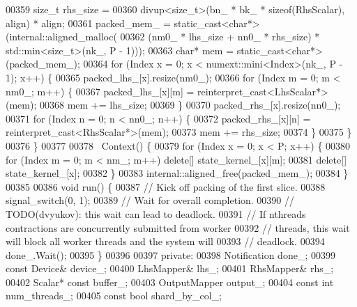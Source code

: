 \begin{DoxyCode}
00359       \textcolor{keywordtype}{size\_t} rhs\_size =
00360           divup<size\_t>(bn\_ * bk\_ * \textcolor{keyword}{sizeof}(RhsScalar), align) * align;
00361       packed\_mem\_ = \textcolor{keyword}{static\_cast<}\textcolor{keywordtype}{char}*\textcolor{keyword}{>}(internal::aligned\_malloc(
00362           (nm0\_ * lhs\_size + nn0\_ * rhs\_size) * std::min<size\_t>(nk\_, P - 1)));
00363       \textcolor{keywordtype}{char}* mem = \textcolor{keyword}{static\_cast<}\textcolor{keywordtype}{char}*\textcolor{keyword}{>}(packed\_mem\_);
00364       \textcolor{keywordflow}{for} (Index x = 0; x < numext::mini<Index>(nk\_, P - 1); x++) \{
00365         packed\_lhs\_[x].resize(nm0\_);
00366         \textcolor{keywordflow}{for} (Index m = 0; m < nm0\_; m++) \{
00367           packed\_lhs\_[x][m] = \textcolor{keyword}{reinterpret\_cast<}LhsScalar*\textcolor{keyword}{>}(mem);
00368           mem += lhs\_size;
00369         \}
00370         packed\_rhs\_[x].resize(nn0\_);
00371         \textcolor{keywordflow}{for} (Index n = 0; n < nn0\_; n++) \{
00372           packed\_rhs\_[x][n] = \textcolor{keyword}{reinterpret\_cast<}RhsScalar*\textcolor{keyword}{>}(mem);
00373           mem += rhs\_size;
00374         \}
00375       \}
00376     \}
00377 
00378     ~Context() \{
00379       \textcolor{keywordflow}{for} (Index x = 0; x < P; x++) \{
00380         \textcolor{keywordflow}{for} (Index m = 0; m < nm\_; m++) \textcolor{keyword}{delete}[] state\_kernel\_[x][m];
00381         \textcolor{keyword}{delete}[] state\_kernel\_[x];
00382       \}
00383       internal::aligned\_free(packed\_mem\_);
00384     \}
00385 
00386     \textcolor{keywordtype}{void} run() \{
00387       \textcolor{comment}{// Kick off packing of the first slice.}
00388       signal\_switch(0, 1);
00389       \textcolor{comment}{// Wait for overall completion.}
00390       \textcolor{comment}{// TODO(dvyukov): this wait can lead to deadlock.}
00391       \textcolor{comment}{// If nthreads contractions are concurrently submitted from worker}
00392       \textcolor{comment}{// threads, this wait will block all worker threads and the system will}
00393       \textcolor{comment}{// deadlock.}
00394       done\_.Wait();
00395     \}
00396 
00397    \textcolor{keyword}{private}:
00398     Notification done\_;
00399     \textcolor{keyword}{const} Device& device\_;
00400     LhsMapper& lhs\_;
00401     RhsMapper& rhs\_;
00402     Scalar* \textcolor{keyword}{const} buffer\_;
00403     OutputMapper output\_;
00404     \textcolor{keyword}{const} \textcolor{keywordtype}{int} num\_threads\_;
00405     \textcolor{keyword}{const} \textcolor{keywordtype}{bool} shard\_by\_col\_;

\end{DoxyCode}

